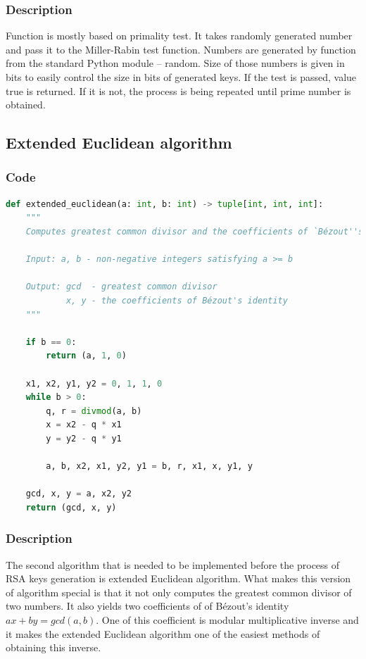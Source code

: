 \documentclass{article}
\begin{document}
\normalsize

\subsubsection{Description}
Function is mostly based on primality test. It takes randomly generated number and
pass it to the Miller-Rabin test function. Numbers are generated by function from
the standard Python module -- random. Size of those numbers is given in bits to
easily control the size in bits of generated keys. If the test is passed, value true is returned.
If it is not, the process is being repeated until prime number is obtained.

\subsection{Extended Euclidean algorithm}
\subsubsection{Code}

\small

\begin{lstlisting}[language=Python]
    def extended_euclidean(a: int, b: int) -> tuple[int, int, int]:
    """
    Computes greatest common divisor and the coefficients of `Bézout''s identity.

    Input: a, b - non-negative integers satisfying a >= b

    Output: gcd  - greatest common divisor
            x, y - the coefficients of Bézout's identity
    """

    if b == 0:
        return (a, 1, 0)

    x1, x2, y1, y2 = 0, 1, 1, 0
    while b > 0:
        q, r = divmod(a, b)
        x = x2 - q * x1
        y = y2 - q * y1

        a, b, x2, x1, y2, y1 = b, r, x1, x, y1, y

    gcd, x, y = a, x2, y2
    return (gcd, x, y)
\end{lstlisting}

\normalsize

\subsubsection{Description}
The second algorithm that is needed to be implemented before the process of RSA keys generation
is extended Euclidean algorithm. What makes this version of algorithm special is that it not only
computes the greatest common divisor of two numbers. It also yields two coefficients of of Bézout's identity
$ax + by = gcd(a, b)$. One of this coefficient is modular multiplicative inverse and it makes the extended
Euclidean algorithm one of the easiest methods of obtaining this inverse.
\end{document}
